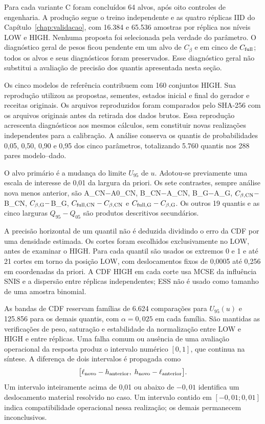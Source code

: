 Para cada variante C foram concluídos 64 alvos, após oito controles de
engenharia. A produção segue o treino independente e as quatro réplicas IID
do Capítulo~\ref{chap:validacao}, com 16.384 e 65.536 amostras por réplica
nos níveis LOW e HIGH. Nenhuma proposta foi selecionada pela verdade do
parâmetro. O diagnóstico geral de pesos ficou pendente em um alvo de
$C_\beta$ e em cinco de $C_{\rm full}$; todos os alvos e seus diagnósticos
foram preservados. Esse diagnóstico geral não substitui a avaliação de
precisão dos quantis apresentada nesta seção.

Os cinco modelos de referência contribuem com 160 conjuntos HIGH. Sua reprodução
utilizou as propostas, sementes, estados inicial e final do gerador e
receitas originais. Os arquivos reproduzidos foram comparados pelo SHA-256
com os arquivos originais antes da retirada dos dados brutos. Essa
reprodução acrescenta diagnósticos aos mesmos cálculos, sem constituir
novas realizações independentes para a calibração. A análise conserva os
quantis de probabilidades 0,05, 0,50, 0,90 e 0,95 dos cinco parâmetros,
totalizando 5.760 quantis nos 288 pares modelo--dado.

O alvo primário é a mudança do limite $U_{95}$ de $u$. Adotou-se previamente
uma escala de interesse de 0,01 da largura da priori. Os sete contrastes,
sempre análise nova menos anterior, são A\_CN$-$A0\_CN, B\_CN$-$A\_CN,
B\_G$-$A\_G, $C_{\beta,\rm CN}-$B\_CN, $C_{\beta,\rm G}-$B\_G,
$C_{{\rm full},\rm CN}-C_{\beta,\rm CN}$ e
$C_{{\rm full},\rm G}-C_{\beta,\rm G}$. Os outros 19 quantis e as cinco
larguras $Q_{95}-Q_{05}$ são produtos descritivos secundários.

A precisão horizontal de um quantil não é deduzida dividindo o erro da
CDF por uma densidade estimada. Os cortes foram escolhidos exclusivamente
no LOW, antes de examinar o HIGH. Para cada quantil são usados os extremos
0 e 1 e até 21 cortes em torno da posição LOW, com deslocamentos fixos de
0,0005 até 0,256 em coordenadas da priori. A CDF HIGH em cada corte usa
MCSE da influência SNIS e a dispersão entre réplicas independentes;
ESS não é usado como tamanho de uma amostra binomial.

As bandas de CDF reservam famílias de 6.624 comparações para $U_{95}(u)$ e
125.856 para os demais quantis, com $\alpha=0,025$ em cada família. São
mantidas as verificações de peso, saturação e estabilidade da normalização
entre LOW e HIGH e entre réplicas. Uma falha comum ou ausência de uma
avaliação operacional da resposta produz o intervalo numérico $[0,1]$,
que continua na síntese. A diferença de dois intervalos é propagada como
\begin{equation}
 \bigl[\ell_{\rm novo}-h_{\rm anterior},\;
  h_{\rm novo}-\ell_{\rm anterior}\bigr].
\end{equation}
Um intervalo inteiramente acima de 0,01 ou abaixo de $-0,01$ identifica
um deslocamento material resolvido no caso. Um intervalo contido em
$[-0,01;0,01]$ indica compatibilidade operacional nessa realização;
os demais permanecem inconclusivos.

